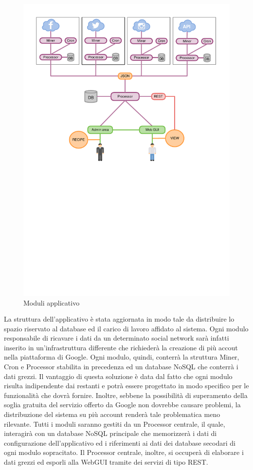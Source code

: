 \begin{figure}[htbp]
    \centering
    \centerline{\includegraphics[scale=0.8]{./images/moduli_bdsmapp.pdf}}
    \caption{Moduli applicativo}
\end{figure}

La struttura dell'applicativo è stata aggiornata in modo tale da distribuire lo spazio riservato al database
ed il carico di lavoro affidato al sistema. Ogni modulo responsabile di ricavare i dati da un determinato
social network sarà infatti inserito in un'infrastruttura differente che richiederà la creazione di più accout
nella piattaforma di Google. Ogni modulo, quindi, conterrà la struttura Miner, Cron e Processor stabilita in
precedenza ed un database NoSQL che conterrà i dati grezzi. Il vantaggio di questa soluzione è data dal fatto
che ogni modulo risulta indipendente dai restanti e potrà essere progettato in modo specifico per le funzionalità
che dovrà fornire. Inoltre, sebbene la possibilità di superamento della soglia gratuita del servizio offerto da
Google non dovrebbe causare problemi, la distribuzione del sistema su più account renderà tale problematica meno
rilevante.
Tutti i moduli saranno gestiti da un Processor centrale, il quale, interagirà con un database NoSQL principale che
memorizzerà i dati di configurazione dell'applicativo ed i riferimenti ai dati dei database secodari di ogni modulo
sopracitato. Il Processor centrale, inoltre, si occuperà di elaborare i dati grezzi ed esporli alla WebGUI
tramite dei servizi di tipo REST.
